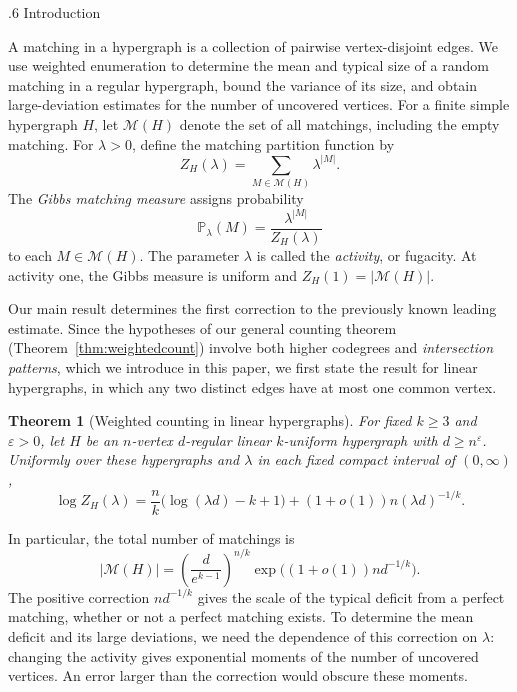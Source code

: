 \documentclass[11pt,reqno]{amsart}
\makeatletter
\numberwithin{equation}{section}
\renewcommand{\section}{\@startsection{section}{1}%
    \z@{1.3\linespacing\@plus.5\linespacing\@minus.2\linespacing}%
    {.6\linespacing}%
    {\normalfont\scshape\centering}}
\theoremstyle{plain}
\newtheorem{theorem}{Theorem}[section]
\theoremstyle{definition}
\newcommand{\calM}{\mathcal{M}}
\newcommand{\Prob}{\mathbb P}
\newcommand{\eps}{\varepsilon}
\makeatother
\begin{document}

\section{Introduction}\label{sec:intro}

A matching in a hypergraph is a collection of pairwise vertex-disjoint edges.
We use weighted enumeration to determine the mean and typical size of a random matching in a regular hypergraph, bound the variance of its size, and obtain large-deviation estimates for the number of uncovered vertices.
For a finite simple hypergraph $H$, let $\calM(H)$ denote the set of all matchings, including the empty matching.
For $\lambda>0$, define the matching partition function by
\[
    Z_H(\lambda)=\sum_{M\in\calM(H)}\lambda^{|M|}.
\]
The \emph{Gibbs matching measure} assigns probability
\[
    \Prob_\lambda(M)=\frac{\lambda^{|M|}}{Z_H(\lambda)}
\]
to each $M\in\calM(H)$.
The parameter $\lambda$ is called the \emph{activity}, or fugacity.
At activity one, the Gibbs measure is uniform and $Z_H(1)=|\calM(H)|$.

Our main result determines the first correction to the previously known leading estimate.
Since the hypotheses of our general counting theorem (Theorem~\ref{thm:weightedcount}) involve both higher codegrees and \emph{intersection patterns}, which we introduce in this paper, we first state the result for linear hypergraphs, in which any two distinct edges have at most one common vertex.

\begin{theorem}[Weighted counting in linear hypergraphs]\label{thm:linearcount}
    For fixed $k\ge3$ and $\eps>0$, let $H$ be an $n$-vertex $d$-regular linear $k$-uniform hypergraph with $d\ge n^\eps$.
    Uniformly over these hypergraphs and $\lambda$ in each fixed compact interval of $(0,\infty)$,
    \[
        \log Z_H(\lambda)=\frac nk\bigl(\log(\lambda d)-k+1\bigr)
        +(1+o(1))n(\lambda d)^{-1/k}.
    \]
\end{theorem}

In particular, the total number of matchings is
\[
    |\calM(H)|=\left(\frac d{e^{k-1}}\right)^{n/k}
    \exp\bigl((1+o(1))nd^{-1/k}\bigr).
\]
The positive correction $nd^{-1/k}$ gives the scale of the typical deficit from a perfect matching, whether or not a perfect matching exists.
To determine the mean deficit and its large deviations, we need the dependence of this correction on $\lambda$: changing the activity gives exponential moments of the number of uncovered vertices.
An error larger than the correction would obscure these moments.
\end{document}

